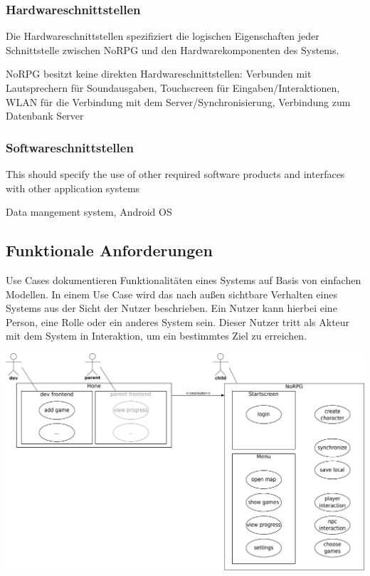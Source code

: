 			
		
		\subsubsection{Hardwareschnittstellen}
			Die Hardwareschnittstellen spezifiziert die logischen Eigenschaften jeder Schnittstelle zwischen NoRPG und den Hardwarekomponenten des Systems.
			
			NoRPG besitzt keine direkten Hardwareschnittstellen: Verbunden mit Lautsprechern für Soundausgaben, Touchscreen für Eingaben/Interaktionen, WLAN für die Verbindung mit dem Server/Synchronisierung, Verbindung zum Datenbank Server
			
		\subsubsection{Softwareschnittstellen}
			This should specify the use of other required software products and interfaces with other application systems 
			
			Data mangement system, Android OS

	\subsection{Funktionale Anforderungen}
		Use Cases dokumentieren Funktionalitäten eines Systems auf Basis von einfachen Modellen. In einem Use Case wird das nach außen sichtbare Verhalten eines Systems aus der Sicht der Nutzer beschrieben. Ein Nutzer kann hierbei eine Person, eine Rolle oder ein anderes System sein. Dieser Nutzer tritt als Akteur mit dem System in Interaktion, um ein bestimmtes Ziel zu erreichen.
	
		\begin{center}
			\includegraphics[width=\textwidth]{pics/OUCD.pdf}
		\end{center}
	
